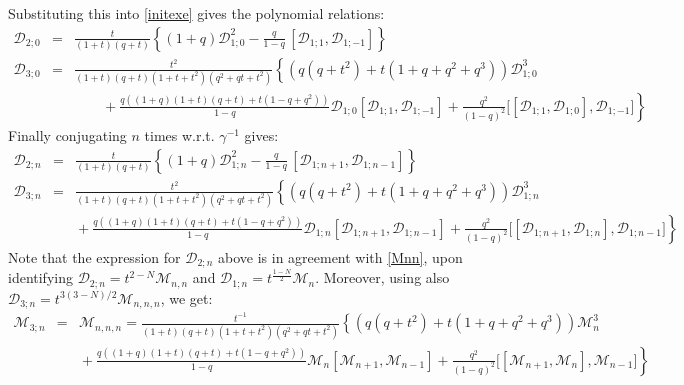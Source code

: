 \begin{example}
Substituting this into \eqref{initexe} gives the polynomial relations:
\begin{eqnarray*}
{\mathcal D}_{2;0}&=&\frac{t}{(1+t)(q+t)} \left\{(1+q){\mathcal D}_{1;0}^2-\frac{q}{1-q} \,[{\mathcal D}_{1;1},{\mathcal D}_{1;-1}] \right\}\\
{\mathcal D}_{3;0}&=&\frac{t^2}{(1+t)(q+t)(1+t+t^2) (q^2+q t+t^2)}\left\{ (q(q+t^2)+t(1+q+q^2+q^3)){\mathcal D}_{1;0}^3 \right.\\
&& \qquad \left. \!\!\!\!\!\!\!\!\!\!\!\!\!\!\!\!\!\!\!+\frac{q((1+q)(1+t)(q+t)+t(1-q+q^2))}{1-q} 
{\mathcal D}_{1;0}[{\mathcal D}_{1;1},{\mathcal D}_{1;-1}]+\frac{q^2}{(1-q)^2} 
\big[ [{\mathcal D}_{1;1},{\mathcal D}_{1;0}],{\mathcal D}_{1;-1}\big]  \right\} 
\end{eqnarray*}
Finally conjugating $n$ times w.r.t. $\gamma^{-1}$ gives:
\begin{eqnarray*}
{\mathcal D}_{2;n}&=&\frac{t}{(1+t)(q+t)} \left\{(1+q){\mathcal D}_{1;n}^2-\frac{q}{1-q} \,[{\mathcal D}_{1;n+1},{\mathcal D}_{1;n-1}] \right\}\\
{\mathcal D}_{3;n}&=&\frac{t^2}{(1+t)(q+t)(1+t+t^2) (q^2+q t+t^2)}
\left\{ (q(q+t^2)+t(1+q+q^2+q^3)){\mathcal D}_{1;n}^3 \right.\\
&& \left.  \!\!\!\!\!\!\!\!\!\!\!\!\!\!\!\!\!\!\!\!\!\!\!+\frac{q((1+q)(1+t)(q+t)+t(1-q+q^2))}{1-q} {\mathcal D}_{1;n}[{\mathcal D}_{1;n+1},{\mathcal D}_{1;n-1}]+\frac{q^2}{(1-q)^2}
\big[ [{\mathcal D}_{1;n+1},{\mathcal D}_{1;n}],{\mathcal D}_{1;n-1}\big]  \right\} 
\end{eqnarray*}
Note that the expression for ${\mathcal D}_{2;n}$ above is in agreement with \eqref{Mnn}, upon identifying
${\mathcal D}_{2;n}=t^{2-N}{\mathcal M}_{n,n}$ and ${\mathcal D}_{1;n}=t^{\frac{1-N}{2}}{\mathcal M}_{n}$.
Moreover, using also ${\mathcal D}_{3;n}=t^{3(3-N)/2}{\mathcal M}_{n,n,n}$, we get:
\begin{eqnarray*}
{\mathcal M}_{3;n}&=&{\mathcal M}_{n,n,n}=\frac{t^{-1}}{(1+t)(q+t)(1+t+t^2) (q^2+q t+t^2)}
\left\{ (q(q+t^2)+t(1+q+q^2+q^3)){\mathcal M}_{n}^3 \right.\\
&& \left. \!\!\!\!\!\!\!\!\!\!\!\!\!\!\!\!\!\!\!+\frac{q((1+q)(1+t)(q+t)+t(1-q+q^2))}{1-q}
{\mathcal M}_{n}[{\mathcal M}_{n+1},{\mathcal M}_{n-1}]+\frac{q^2}{(1-q)^2}
\big[ [{\mathcal M}_{n+1},{\mathcal M}_{n}],{\mathcal M}_{n-1}\big]  \right\} 
\end{eqnarray*}
\end{example}

